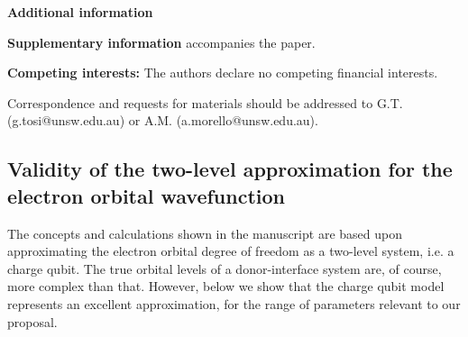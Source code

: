 \documentclass[aps,prb,superscriptaddress,nobibnotes,twocolumn]{revtex4-1}
\renewcommand{\figurename}{Figure}
\begin{document}
\vspace{3mm}
\noindent \textbf{Additional information}

\vspace{1mm}
\noindent \textbf{Supplementary information} accompanies the paper.

\vspace{1mm}
\noindent \textbf{Competing interests:} The authors declare no competing financial interests.

\vspace{1mm}
\noindent Correspondence and requests for materials should be addressed to G.T. (g.tosi@unsw.edu.au) or A.M. (a.morello@unsw.edu.au).

\clearpage



\renewcommand\thesubsection{Supplementary Note \arabic{subsection}}
\setcounter{page}{1}
\setcounter{equation}{0}
\setcounter{figure}{0}
\renewcommand{\figurename}{Supplementary Figure}

\subsection{\label{App:Nemo-orb}Validity of the two-level approximation for the electron orbital wavefunction}

The concepts and calculations shown in the manuscript are based upon approximating the electron orbital degree of freedom as a two-level system, i.e. a charge qubit. The true orbital levels of a donor-interface system are, of course, more complex than that. However, below we show that the charge qubit model represents an excellent approximation, for the range of parameters relevant to our proposal.
\end{document}

